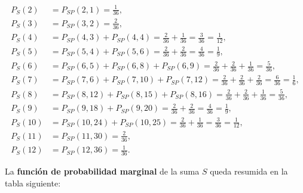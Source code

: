 \documentclass[]{book}
\begin{document}
\[
\begin{array}{rl}
P_S(2) & = P_{SP}(2,1)=\frac{1}{36},\\
P_S(3) & = P_{SP}(3,2)=\frac{2}{36},\\
P_S(4) & = P_{SP}(4,3)+P_{SP}(4,4)=\frac{2}{36}+\frac{1}{36}=\frac{3}{36}=\frac{1}{12},\\
P_S(5) & = P_{SP}(5,4)+P_{SP}(5,6)=\frac{2}{36}+\frac{2}{36}=\frac{4}{36}=\frac{1}{9},\\
P_S(6) & = P_{SP}(6,5)+P_{SP}(6,8)+P_{SP}(6,9)=\frac{2}{36}+\frac{2}{36}+\frac{1}{36}=\frac{5}{36},\\
P_S(7) & = P_{SP}(7,6)+P_{SP}(7,10)+P_{SP}(7,12)=\frac{2}{36}+\frac{2}{36}+\frac{2}{36}=\frac{6}{36}=\frac{1}{6},\\
P_S(8) & = P_{SP}(8,12)+P_{SP}(8,15)+P_{SP}(8,16)=\frac{2}{36}+\frac{2}{36}+\frac{1}{36}=\frac{5}{36},\\
P_S(9) & = P_{SP}(9,18)+P_{SP}(9,20)=\frac{2}{36}+\frac{2}{36}=\frac{4}{36}=\frac{1}{9},\\
P_S(10) & = P_{SP}(10,24)+P_{SP}(10,25)=\frac{2}{36}+\frac{1}{36}=\frac{3}{36}=\frac{1}{12},\\
P_S(11) & = P_{SP}(11,30)=\frac{2}{36},\\
P_S(12) & = P_{SP}(12,36)=\frac{1}{36}.
\end{array}
\]

La \textbf{función de probabilidad marginal} de la suma \(S\) queda resumida en la tabla siguiente:
\end{document}
